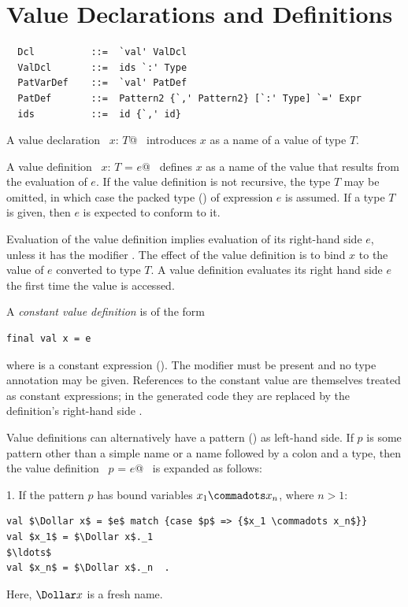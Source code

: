 \section{Value Declarations and Definitions}
\label{sec:valdef}

\syntax\begin{lstlisting}
  Dcl          ::=  `val' ValDcl
  ValDcl       ::=  ids `:' Type
  PatVarDef    ::=  `val' PatDef 
  PatDef       ::=  Pattern2 {`,' Pattern2} [`:' Type] `=' Expr
  ids          ::=  id {`,' id}
\end{lstlisting}

A value declaration ~\lstinline@val $x$: $T$@~ introduces $x$ as a name of a value of
type $T$.  

A value definition ~\lstinline@val $x$: $T$ = $e$@~ defines $x$ as a
name of the value that results from the evaluation of $e$. 
If the value definition is not recursive, the type
$T$ may be omitted, in which case the packed type () of expression $e$ is
assumed.  If a type $T$ is given, then $e$ is expected to conform to
it.

Evaluation of the value definition implies evaluation of its
right-hand side $e$, unless it has the modifier \lstinline@lazy@.  The
effect of the value definition is to bind $x$ to the value of $e$
converted to type $T$. A \lstinline@lazy@ value definition evaluates
its right hand side $e$ the first time the value is accessed.

A {\em constant value definition} is of the form
\begin{lstlisting}
final val x = e
\end{lstlisting}
where \lstinline@e@ is a constant expression
(). 
The \lstinline@final@ modifier must be
present and no type annotation may be given. References to the
constant value \lstinline@x@ are themselves treated as constant expressions; in the
generated code they are replaced by the definition's right-hand side \lstinline@e@.

Value definitions can alternatively have a pattern
() as left-hand side.  If $p$ is some pattern other
than a simple name or a name followed by a colon and a type, then the
value definition ~\lstinline@val $p$ = $e$@~ is expanded as follows:

1. If the pattern $p$ has bound variables $x_1 \commadots x_n$, where $n > 1$:
\begin{lstlisting}
val $\Dollar x$ = $e$ match {case $p$ => {$x_1 \commadots x_n$}}
val $x_1$ = $\Dollar x$._1
$\ldots$
val $x_n$ = $\Dollar x$._n  .
\end{lstlisting}
Here, $\Dollar x$ is a fresh name.  

